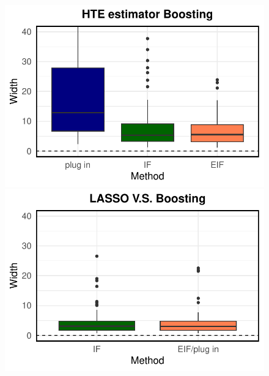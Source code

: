 \begin{figure}[ht]
\begin{minipage}{0.3\textwidth}
                \includegraphics[clip, trim = 0cm 0cm 0cm 0cm, width = \textwidth]{plot/ACIC_linear_propensity_nonlinear_HTE_CI_width_Boosting.pdf}
        \end{minipage}
        \begin{minipage}{0.3\textwidth}
                \centering
                \includegraphics[clip, trim = 0cm 0cm 0cm 0cm, width = \textwidth]{plot/ACIC_linear_propensity_nonlinear_HTE_CI_width_LASSO_V.S._Boosting.pdf}
        \end{minipage}        
          \\        
        \begin{minipage}{0.3\textwidth}
                \centering

\end{minipage}
\end{figure}
